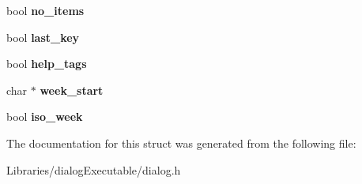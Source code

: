 \begin{DoxyCompactItemize}
\item 
bool {\bfseries no\+\_\+items}\hypertarget{struct_d_i_a_l_o_g___v_a_r_s_ad1b751848ff357177a1a6b5ca4a2f2dd}{}\label{struct_d_i_a_l_o_g___v_a_r_s_ad1b751848ff357177a1a6b5ca4a2f2dd}

\item 
bool {\bfseries last\+\_\+key}\hypertarget{struct_d_i_a_l_o_g___v_a_r_s_ad85cb4e27569e10eea13b742acd4beb9}{}\label{struct_d_i_a_l_o_g___v_a_r_s_ad85cb4e27569e10eea13b742acd4beb9}

\item 
bool {\bfseries help\+\_\+tags}\hypertarget{struct_d_i_a_l_o_g___v_a_r_s_a2c318b55ebb3066f69945a15bae581fe}{}\label{struct_d_i_a_l_o_g___v_a_r_s_a2c318b55ebb3066f69945a15bae581fe}

\item 
char $\ast$ {\bfseries week\+\_\+start}\hypertarget{struct_d_i_a_l_o_g___v_a_r_s_a8dd99921858eb7dbd6add0a1768f49af}{}\label{struct_d_i_a_l_o_g___v_a_r_s_a8dd99921858eb7dbd6add0a1768f49af}

\item 
bool {\bfseries iso\+\_\+week}\hypertarget{struct_d_i_a_l_o_g___v_a_r_s_aaa12878f88ec263c4f15a853484b5496}{}\label{struct_d_i_a_l_o_g___v_a_r_s_aaa12878f88ec263c4f15a853484b5496}

\end{DoxyCompactItemize}


The documentation for this struct was generated from the following file\+:\begin{DoxyCompactItemize}
\item 
Libraries/dialog\+Executable/dialog.\+h\end{DoxyCompactItemize}
